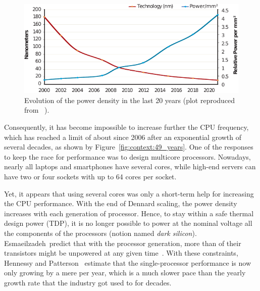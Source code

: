         \begin{figure}[htpb]
            \centering
            \includegraphics[width=\linewidth]{img/context/power_density.pdf}
            \caption{Evolution of the power density in the last 20 years (plot reproduced from ~\cite[Figure
            3]{Hennessy_2019}).}%
            \label{fig:context:power_density}
        \end{figure}

        Consequently, it has become impossible to increase further the CPU frequency, which has reached a limit of about
         since 2006 after an exponential growth of several decades, as shown by
        Figure~\ref{fig:context:49_years}. One of the responses to keep the race for performance was to design multicore
        processors. Nowadays, nearly all laptops and smartphones have several cores, while high-end servers can have two
        or four sockets with up to 64 cores per socket.

        Yet, it appears that using several cores was only a short-term help for increasing the CPU
        performance. With the end of Dennard scaling, the power density increases with each generation of processor.
        Hence, to stay within a safe thermal design power (TDP), it is no longer possible to power at the nominal
        voltage all the components of the processors (notion named \emph{dark silicon}). Esmaeilzadeh~\etal predict
        that with the  processor generation, more than  of their transistors might
        be unpowered at any given time~\cite{Esmaeilzadeh_2011}. With these constraints, Hennessy and
        Patterson~\cite{Hennessy_2019,Hennessy_youtube} estimate that the single-processor performance is now only
        growing by a mere  per year, which is a much slower pace than the  yearly
        growth rate that the industry got used to for decades.


